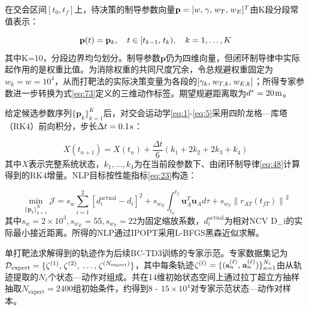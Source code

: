 在交会区间$[{t_0},{t_f}]$上，待决策的制导参数向量${\mathbf{p}} = {[w,{\kern 1pt} \gamma ,{\kern 1pt} {w_T},{\kern 1pt} {w_E}]^T}$由K段分段常值表示：

\begin{equation}
\label{eq:69}
{\mathbf{p}}(t) = {{\mathbf{p}}_k},\quad t \in [{t_{k - 1}},{\kern 1pt} {t_k}),\quad k = 1, \ldots ,K
\end{equation}
其中K=10，分段边界均匀划分。制导参数${\mathbf{p}}$仍为四维向量，但闭环制导律中实际起作用的是权重比值。为消除权重的共同尺度冗余，令总规避权重固定为${w_k} = w = {10^4}$，从而打靶法的实际决策变量为各段的$[{\gamma _k},{\kern 1pt} {w_{T,k}},{\kern 1pt} {w_{E,k}}]$；所得专家参数进一步转换为式\eqref{eq:73}定义的三维动作标签。期望规避距离取为${d^*} = 20{\kern 1pt} {\text{m}}$。

给定候选参数序列$\{ {{\mathbf{p}}_k}\} _{k = 1}^K$后，对交会运动学\eqref{eq:1}-\eqref{eq:5}采用四阶龙格—库塔（RK4）前向积分，步长$\Delta t = 0.1{\kern 1pt} {\text{s}}$：

\begin{equation}
\label{eq:70}
X({t_{n + 1}}) = X({t_n}) + \frac{{\Delta t}}{6}({k_1} + 2{k_2} + 2{k_3} + {k_4})
\end{equation}
其中$X$表示完整系统状态，${k_1}, \ldots ,{k_4}$为在当前段参数下、由闭环制导律\eqref{eq:48}计算得到的RK4增量。NLP目标按性能指标\eqref{eq:23}构造：

\begin{equation}
\label{eq:71}
\mathop {\min }\limits_{\{ {{\mathbf{p}}_k}\} _{k = 1}^K} \mathcal{J} = {s_w}\sum\limits_{i = 1}^2 {{{\left[ {d_i^{{\text{actual}}} - {d_i}} \right]}^2}}  + {s_{{w_E}}}\int_{{t_0}}^{{t_f}} {{\mathbf{u}}_A^T{{\mathbf{u}}_A}d\tau }  + {s_{{w_T}}}{\left\| {{r_{AT}}({t_{fT}})} \right\|^2}
\end{equation}
其中${s_w} = 2 \times {10^3},{s_{{w_E}}} = 55,{s_{{w_T}}} = 22$为固定缩放系数，$d_i^{{\text{actual}}}$为相对NCV D\_i的实际最小接近距离。所得的NLP通过IPOPT采用L-BFGS黑森近似求解。

单打靶法求解得到的轨迹作为后续BC-TD3训练的专家示范。专家数据集记为${\mathcal{D}_{{\text{expert}}}} = \{ {\zeta ^{(1)}},{\kern 1pt} {\zeta ^{(2)}},{\kern 1pt}  \ldots ,{\kern 1pt} {\zeta ^{({N_{{\text{expert}}}})}}\} $，其中每条轨迹${\zeta ^{(\ell )}} = \{ ({\mathbf{s}}_n^{(\ell )},{\kern 1pt} {\mathbf{a}}_n^{(\ell )})\} _{n = 1}^{{N_\ell }}$由从轨迹提取的${N_\ell}$个状态—动作对组成。共在14维初始状态空间上通过拉丁超立方抽样抽取${N_{{\text{expert}}}} = 2400$组初始条件，约得到$8{\text{ - }}15 \times {10^4}$对专家示范状态—动作对样本。

